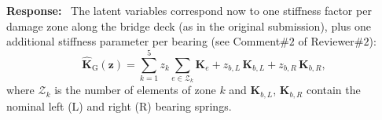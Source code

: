 \documentclass[11pt]{article}
\newenvironment{response}{\par\smallskip\noindent\color{resp}\textbf{Response:}\ }{\par}
\newcommand{\z}{\mathbf{z}}
\begin{document}
\begin{response}
The latent variables correspond now to one stiffness factor per damage zone along the bridge deck (as in the original submission), plus one additional stiffness parameter per bearing (see Comment$\#2$ of Reviewer$\#2$):
\begin{equation}
\hat{\mathbf{K}}_{\mathrm{G}}(\z)=\sum_{k=1}^{5} z_k\sum_{e\in\mathcal{Z}_k}\mathbf{K}_{e}
+z_{b,L}\,\mathbf{K}_{b,L}+z_{b,R}\,\mathbf{K}_{b,R},
\label{eq:Kz}
\end{equation}
where $\mathcal{Z}_k$ is the number of elements of zone $k$ and $\mathbf{K}_{b,L}$, $\mathbf{K}_{b,R}$ contain the nominal left (L) and right (R) bearing springs.
%
%

\end{response}
\end{document}
